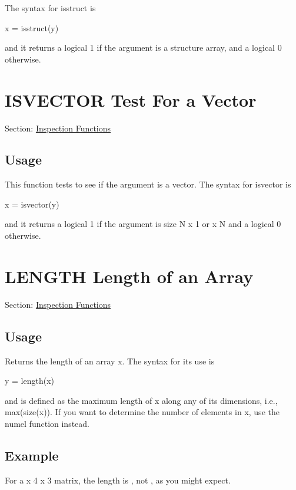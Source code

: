The syntax for {\ttfamily isstruct} is \begin{DoxyVerb}   x = isstruct(y)
\end{DoxyVerb}
 and it returns a logical 1 if the argument is a structure array, and a logical 0 otherwise. \hypertarget{inspection_isvector}{}\section{I\-S\-V\-E\-C\-T\-O\-R Test For a Vector}\label{inspection_isvector}
Section\-: \hyperlink{sec_inspection}{Inspection Functions} \hypertarget{vtkwidgets_vtkxyplotwidget_Usage}{}\subsection{Usage}\label{vtkwidgets_vtkxyplotwidget_Usage}
This function tests to see if the argument is a vector. The syntax for {\ttfamily isvector} is \begin{DoxyVerb}   x = isvector(y)
\end{DoxyVerb}
 and it returns a logical 1 if the argument is size {\ttfamily N x 1} or { x N} and a logical 0 otherwise. \hypertarget{inspection_length}{}\section{L\-E\-N\-G\-T\-H Length of an Array}\label{inspection_length}
Section\-: \hyperlink{sec_inspection}{Inspection Functions} \hypertarget{vtkwidgets_vtkxyplotwidget_Usage}{}\subsection{Usage}\label{vtkwidgets_vtkxyplotwidget_Usage}
Returns the length of an array {\ttfamily x}. The syntax for its use is \begin{DoxyVerb}   y = length(x)
\end{DoxyVerb}
 and is defined as the maximum length of {\ttfamily x} along any of its dimensions, i.\-e., {\ttfamily max(size(x))}. If you want to determine the number of elements in {\ttfamily x}, use the {\ttfamily numel} function instead. \hypertarget{variables_struct_Example}{}\subsection{Example}\label{variables_struct_Example}
For a { x 4 x 3} matrix, the length is {}, not {}, as you might expect.



